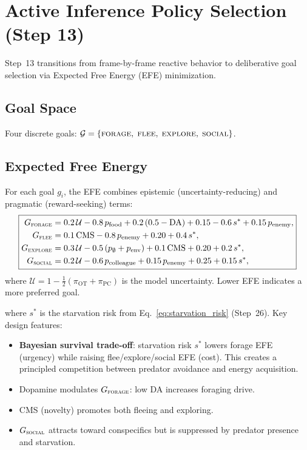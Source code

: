 \documentclass[11pt,a4paper]{article}
\begin{document}
\section{Active Inference Policy Selection (Step 13)}\label{sec:active}

Step~13 transitions from frame-by-frame reactive behavior to deliberative
goal selection via Expected Free Energy (EFE) minimization.

\subsection{Goal Space}

Four discrete goals: $\mathcal{G} = \{\textsc{forage},\; \textsc{flee},\;
\textsc{explore},\; \textsc{social}\}$.

\subsection{Expected Free Energy}

For each goal $g_i$, the EFE combines epistemic (uncertainty-reducing) and
pragmatic (reward-seeking) terms:
\begin{equation}\label{eq:efe}
\boxed{
\begin{aligned}
  G_\textsc{forage}  &= 0.2\,\mathcal{U} - 0.8\,p_\text{food}
    + 0.2\,(0.5 - \text{DA}) + 0.15
    - 0.6\,s^* + 0.15\,p_\text{enemy}, \\
  G_\textsc{flee}    &= 0.1\,\text{CMS} - 0.8\,p_\text{enemy} + 0.20
    + 0.4\,s^*, \\
  G_\textsc{explore} &= 0.3\,\mathcal{U}
    - 0.5\,(p_\emptyset + p_\text{env})
    + 0.1\,\text{CMS} + 0.20 + 0.2\,s^*, \\
  G_\textsc{social}  &= 0.2\,\mathcal{U}
    - 0.6\,p_\text{colleague}
    + 0.15\,p_\text{enemy} + 0.25 + 0.15\,s^*,
\end{aligned}
}
\end{equation}
where $\mathcal{U} = 1 - \tfrac{1}{2}(\pi_\text{OT} + \pi_\text{PC})$ is the
model uncertainty.
Lower EFE indicates a more preferred goal.

where $s^*$ is the starvation risk from Eq.~\ref{eq:starvation_risk}
(Step~26).
Key design features:
\begin{itemize}[nosep]
  \item \textbf{Bayesian survival trade-off}: starvation risk $s^*$ lowers
    forage EFE (urgency) while raising flee/explore/social EFE (cost).
    This creates a principled competition between predator avoidance and
    energy acquisition.
  \item Dopamine modulates $G_\textsc{forage}$: low DA increases foraging drive.
  \item CMS (novelty) promotes both fleeing and exploring.
  \item $G_\textsc{social}$ attracts toward conspecifics but is suppressed
    by predator presence and starvation.
\end{itemize}
\end{document}

